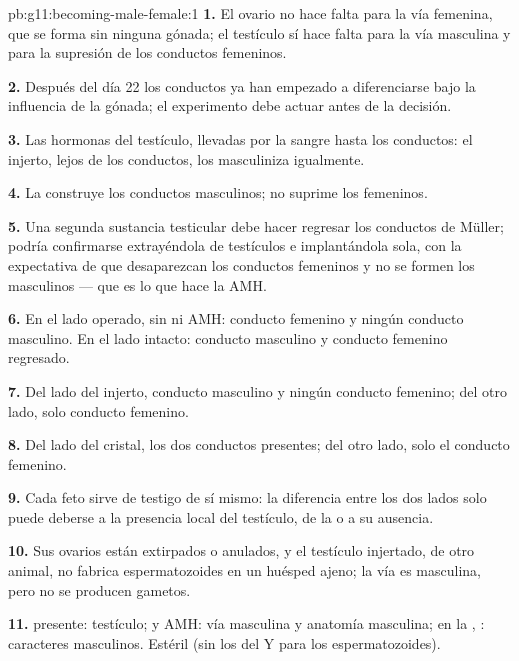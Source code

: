 \begin{solution}{pb:g11:becoming-male-female:1}
\textbf{1.} El ovario no hace falta para la vía femenina, que se forma
sin ninguna gónada; el testículo sí hace falta para la vía masculina y
para la supresión de los conductos femeninos.

\textbf{2.} Después del día 22 los conductos ya han empezado a
diferenciarse bajo la influencia de la gónada; el experimento debe
actuar antes de la decisión.

\textbf{3.} Las hormonas del testículo, llevadas por la sangre hasta
los conductos: el injerto, lejos de los conductos, los masculiniza
igualmente.

\textbf{4.} La  construye los conductos masculinos; no
suprime los femeninos.

\textbf{5.} Una segunda sustancia testicular debe hacer regresar los
conductos de Müller; podría confirmarse extrayéndola de testículos e
implantándola sola, con la expectativa de que desaparezcan los
conductos femeninos y no se formen los masculinos --- que es lo que
hace la AMH.

\textbf{6.} En el lado operado, sin  ni AMH: conducto
femenino y ningún conducto masculino. En el lado intacto: conducto
masculino y conducto femenino regresado.

\textbf{7.} Del lado del injerto, conducto masculino y ningún conducto
femenino; del otro lado, solo conducto femenino.

\textbf{8.} Del lado del cristal, los dos conductos presentes; del otro
lado, solo el conducto femenino.

\textbf{9.} Cada feto sirve de testigo de sí mismo: la diferencia entre
los dos lados solo puede deberse a la presencia local del testículo, de
la  o a su ausencia.

\textbf{10.} Sus ovarios están extirpados o anulados, y el testículo
injertado, de otro animal, no fabrica espermatozoides en un huésped
ajeno; la vía es masculina, pero no se producen gametos.

\textbf{11.}  presente: testículo;  y AMH: vía masculina
y anatomía masculina; en la , : caracteres
masculinos. Estéril (sin los  del Y para los espermatozoides).


\end{solution}
